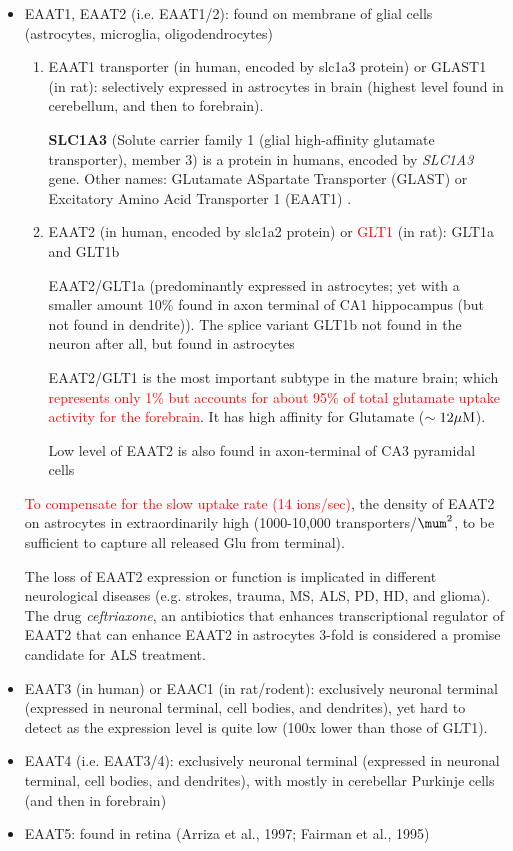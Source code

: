 \begin{itemize}
    \item EAAT1, EAAT2 (i.e. EAAT1/2): found on membrane of glial cells
    (astrocytes, microglia, oligodendrocytes)
    
\begin{enumerate}

  \item EAAT1 transporter (in human, encoded by slc1a3 protein) or GLAST1 (in
  rat):   selectively expressed in astrocytes in brain (highest level found in
  cerebellum, and then to forebrain).
  
{\bf SLC1A3} (Solute carrier family 1 (glial high-affinity glutamate
transporter), member 3) is a protein in humans, encoded by {\it SLC1A3} gene.
Other names: GLutamate ASpartate Transporter (GLAST) or Excitatory Amino Acid
Transporter 1 (EAAT1) .
  
  \item EAAT2 (in human, encoded by slc1a2 protein) or \textcolor{red}{GLT1} (in
  rat): GLT1a and GLT1b
  
  EAAT2/GLT1a (predominantly expressed in astrocytes; yet with a smaller amount
  10\% found in axon terminal of CA1 hippocampus (but not found in dendrite)).
  The splice variant GLT1b not found in the neuron after all, but found in
  astrocytes
  
  EAAT2/GLT1 is the most important subtype in the mature brain; which
  \textcolor{red}{represents only 1\% but accounts for about 95\% of total
  glutamate uptake activity for the forebrain}. It has high affinity for
  Glutamate ($\sim 12 {\mu\text{M}}$).
  
  Low level of EAAT2 is also found in axon-terminal of CA3 pyramidal cells
  
\end{enumerate}    

\textcolor{red}{To compensate for the slow uptake rate (14 ions/sec)}, the
density of EAAT2 on astrocytes in extraordinarily high (1000-10,000
transporters/$\mum^2$, to be sufficient to capture all released Glu from
terminal).

The loss of EAAT2 expression or function is implicated in different neurological
diseases (e.g. strokes, trauma, MS, ALS, PD, HD, and glioma). The drug {\it
ceftriaxone}, an antibiotics that enhances transcriptional regulator of EAAT2
that can enhance EAAT2 in astrocytes 3-fold is considered a promise candidate
for ALS treatment. 

    \item EAAT3 (in human) or EAAC1 (in rat/rodent): exclusively neuronal
    terminal (expressed in neuronal terminal, cell bodies, and dendrites), yet
    hard to detect as the expression level is quite low (100x lower than those
    of GLT1).


   \item EAAT4 (i.e. EAAT3/4): exclusively neuronal terminal
    (expressed in neuronal terminal, cell bodies, and dendrites), with 
    mostly in cerebellar Purkinje cells (and then in forebrain) 
   
    \item EAAT5: found in retina (Arriza et al., 1997; Fairman et al., 1995)
\end{itemize}


